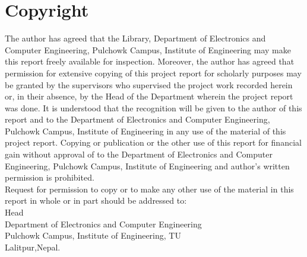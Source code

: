 \documentclass[12pt]{report}
\begin{document}
\chapter*{Copyright}
The author has agreed that the Library, Department of Electronics and Computer Engineering, Pulchowk Campus, Institute of Engineering may make this report freely available for inspection. Moreover, the author has agreed that permission for extensive copying of this project report for scholarly purposes may be granted by the supervisors who supervised the project work recorded herein or, in their absence, by the Head of the Department wherein the project report was done. It is understood that the recognition will be given to the author of this report and to the Department of Electronics and Computer Engineering, Pulchowk Campus, Institute of Engineering in any use of the material of this project report. Copying or publication or the other use of this report for financial gain without approval of to the Department of Electronics and Computer Engineering, Pulchowk Campus, Institute of Engineering and author's written permission is prohibited.\\
Request for permission to copy or to make any other use of the material in this report in whole or in part should be addressed to:\\
\newline
\newline
Head\\
Department of Electronics and Computer Engineering\\
Pulchowk Campus, Institute of Engineering, TU\\
Lalitpur,Nepal.
\end{document}
